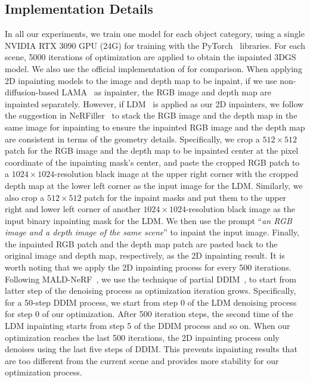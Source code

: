 \subsection{Implementation Details}
 In all our experiments, we train one model for each object category, using a single NVIDIA RTX 3090  GPU (24G) for training with the PyTorch~\cite{paszke2019pytorch}  libraries. For each scene, 5000 iterations of optimization are applied to obtain the inpainted 3DGS model. We also use the official implementation of \cite{wang2024gscream, ye2023gaussiangrouping, chen2024mvip, mirzaei2023spin} for comparison. When applying 2D inpainting models to the image and depth map to be inpaint, if we use non-diffusion-based LAMA~\cite{lama} as inpainter, the RGB image and depth map are inpainted separately. However, if LDM~\cite{ldm} is applied as our 2D inpainters, we follow the suggestion in NeRFiller~\cite{weber2024nerfiller} to stack the RGB image and the depth map in the same image for inpainting to ensure the inpainted RGB image and the depth map are consistent in terms of the geometry details. Specifically, we crop a $512 \times 512$ patch for the RGB image and the depth map to be inpainted center at the pixel coordinate of the inpainting mask's center, and paste the cropped RGB patch to a $1024 \times 1024$-resolution black image at the upper right corner with the cropped depth map at the lower left corner as the input image for the LDM. Similarly, we also crop a $512 \times 512$ patch for the inpaint masks and put them to the upper right and lower left corner of another $1024 \times 1024$-resolution black image as the input binary inpainting mask for the LDM. We then use the prompt ``\textit{an RGB image and a depth image of the same scene}'' to inpaint the input image. Finally, the inpainted RGB patch and the depth map patch are pasted back to the original image and depth map, respectively, as the 2D inpainting result. It is worth noting that we apply the 2D inpainting process for every 500 iterations. Following MALD-NeRF~\cite{lin2024maldnerf}, we use the technique of partial DDIM~\cite{song2020ddim}, to start from latter step of the denoising process as optimization iteration grows. Specifically, for a 50-step DDIM process, we start from step 0 of the LDM denoising process for step 0 of our optimization. After 500 iteration steps, the second time of the LDM inpainting starts from step 5 of the DDIM process and so on. When our optimization reaches the last 500 iterations, the 2D inpainting process only denoises using the last five steps of DDIM. This prevents inpainting results that are too different from the current scene and provides more stability for our optimization process.

